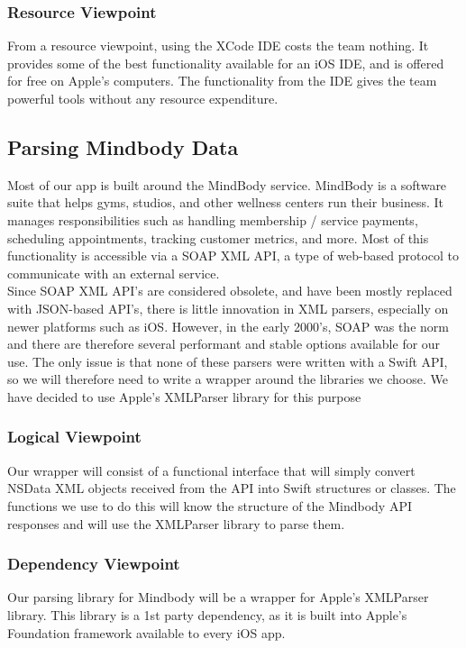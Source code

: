 \documentclass[letterpaper,10pt,titlepage]{article}
\begin{document}
\subsubsection{Resource Viewpoint}
From a resource viewpoint, using the XCode IDE costs the team nothing. It provides some of the best functionality available for an iOS IDE, and is offered for free on Apple’s computers. The functionality from the IDE gives the team powerful tools without any resource expenditure.

\subsection{Parsing Mindbody Data}
Most of our app is built around the MindBody service. MindBody is a software suite that helps gyms, studios, and other wellness centers run their business. It manages responsibilities such as handling membership / service payments, scheduling appointments, tracking customer metrics, and more. Most of this functionality is accessible via a SOAP XML API, a type of web-based protocol to communicate with an external service.\\

Since SOAP XML API’s are considered obsolete, and have been mostly replaced with JSON-based API’s, there is little innovation in XML parsers, especially on newer platforms such as iOS. However, in the early 2000’s, SOAP was the norm and there are therefore several performant and stable options available for our use. The only issue is that none of these parsers were written with a Swift API, so we will therefore need to write a wrapper around the libraries we choose. We have decided to use Apple's XMLParser library for this purpose

\subsubsection{Logical Viewpoint}
Our wrapper will consist of a functional interface that will simply convert NSData XML objects received from the API into Swift structures or classes. The functions we use to do this will know the structure of the Mindbody API responses and will use the XMLParser library to parse them.

\subsubsection{Dependency Viewpoint}
Our parsing library for Mindbody will be a wrapper for Apple's XMLParser library. This library is a 1st party dependency, as it is built into Apple's Foundation framework available to every iOS app.
\end{document}
